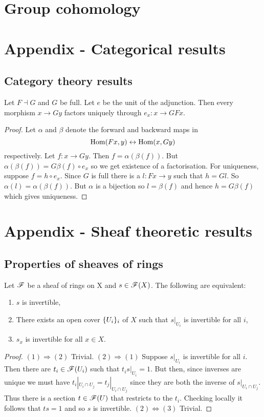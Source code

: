 \documentclass{memoir}
\begin{document}
\chapter{Group cohomology}

\chapter{Appendix - Categorical results}
\section{Category theory results}
\begin{proposition}
    \label{prop:cat_factor}
    Let $F\dashv G$ and $G$ be full.
    Let $e$ be the unit of the adjunction.
    Then every morphism $x\to Gy$ factors uniquely through $e_x:x\to GFx$.
\end{proposition}
\begin{proof}
    Let $\alpha$ and $\beta$ denote the forward and backward maps in
    \begin{equation}
        \operatorname{Hom}(Fx,y) \leftrightarrow \operatorname{Hom}(x,Gy)
    \end{equation}
    respectively.
    Let $f:x\to Gy$.
    Then $f = \alpha(\beta(f))$.
    But $\alpha(\beta(f)) = G\beta(f)\circ e_x$ so we get existence of a factorisation.
    For uniqueness, suppose $f = h\circ e_x$.
    Since $G$ is full there is a $l:Fx\to y$ such that $h = Gl$.
    So $\alpha(l) = \alpha(\beta(f))$.
    But $\alpha$ is a bijection so $l = \beta(f)$ and hence $h = G\beta(f)$ which gives uniqueness.
\end{proof}
\chapter{Appendix - Sheaf theoretic results}
\section{Properties of sheaves of rings}
\begin{thm}
    Let $\mathscr{F}$ be a sheaf of rings on X and $s\in \mathscr{F}(X)$.
    The following are equivalent:
    \begin{enumerate}
        \item $s$ is invertible,
        \item There exists an open cover $\lbrace U_i\rbrace_i$ of $X$ such that $s|_{U_i}$ is invertible for all $i$,
        \item $s_x$ is invertible for all $x\in X$.
    \end{enumerate}
\end{thm}
\begin{proof}
    $(1)\Rightarrow(2)$ Trivial. 
    $(2)\Rightarrow (1)$ Suppose $s|_{U_i}$ is invertible for all $i$.
    Then there are $t_i\in\mathscr{F}(U_i)$ such that $t_is|_{U_i} = 1$.
    But then, since inverses are unique we must have $t_i|_{U_i\cap U_j} = t_j|_{U_i\cap U_j}$ since they are both the inverse of $s|_{U_i\cap U_j}$.
    Thus there is a section $t\in \mathscr{F}(U)$ that restricts to the $t_i$.
    Checking locally it follows that $ts = 1$ and so $s$ is invertible.
    $(2)\Leftrightarrow(3)$ Trivial.
\end{proof}
\end{document}
